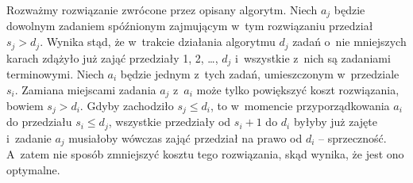 
\subproblem %
Rozważmy rozwiązanie zwrócone przez opisany algorytm.
Niech $a_j$ będzie dowolnym zadaniem spóźnionym zajmującym w~tym rozwiązaniu przedział $s_j>d_j$.
Wynika stąd, że w~trakcie działania algorytmu $d_j$ zadań o~nie mniejszych karach zdążyło już zająć przedziały 1, 2, \dots, $d_j$ i~wszystkie z~nich są zadaniami terminowymi.
Niech $a_i$ będzie jednym z~tych zadań, umieszczonym w~przedziale $s_i$.
Zamiana miejscami zadania $a_j$ z~$a_i$ może tylko powiększyć koszt rozwiązania, bowiem $s_j>d_i$.
Gdyby zachodziło $s_j\le d_i$, to w~momencie przyporządkowania $a_i$ do przedziału $s_i\le d_j$, wszystkie przedziały od $s_i+1$ do $d_i$ byłyby już zajęte i~zadanie $a_j$ musiałoby wówczas zająć przedział na prawo od $d_i$ -- sprzeczność.
A~zatem nie sposób zmniejszyć kosztu tego rozwiązania, skąd wynika, że jest ono optymalne.

\subproblem %
